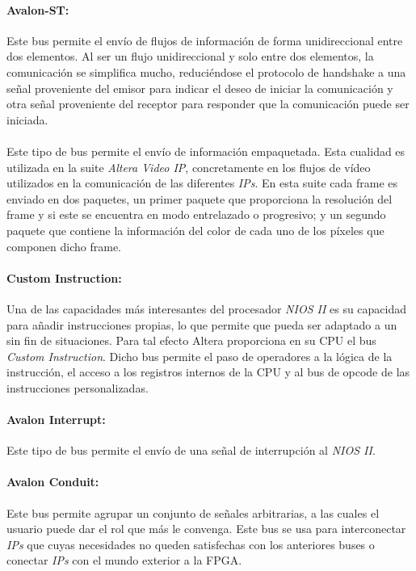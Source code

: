 \documentclass[a4paper,12pt,titlepage,final]{book}
\begin{document}
\paragraph{Avalon-ST:}
Este bus permite el envío de flujos de información de forma unidireccional entre dos elementos. Al ser un flujo unidireccional y solo entre dos elementos, la comunicación se simplifica mucho, reduciéndose el protocolo de handshake a una señal proveniente del emisor para indicar el deseo de iniciar la comunicación y otra señal proveniente del receptor para responder que la comunicación puede ser iniciada.

\paragraph{}
Este tipo de bus permite el envío de información empaquetada. Esta cualidad es utilizada en la suite \textit{Altera Video IP}, concretamente en los flujos de vídeo utilizados en la comunicación de las diferentes \textit{IPs}. En esta suite cada frame es enviado en dos paquetes, un primer paquete que proporciona la resolución del frame y si este se encuentra en modo entrelazado o progresivo; y un segundo paquete que contiene la información del color de cada uno de los píxeles que componen dicho frame. 

\paragraph{Custom Instruction:}
Una de las capacidades más interesantes del procesador \textit{NIOS II} es su capacidad para añadir instrucciones propias, lo que permite que pueda ser adaptado a un sin fin de situaciones. Para tal efecto Altera proporciona en su CPU el bus \textit{Custom Instruction}. Dicho bus permite el paso de operadores a la lógica de la instrucción, el acceso a los registros internos de la CPU y al bus de opcode de las instrucciones personalizadas.  

\paragraph{Avalon Interrupt:}
Este tipo de bus permite el envío de una señal de interrupción al \textit{NIOS II}.
 
\paragraph{Avalon Conduit:}
Este bus permite agrupar un conjunto de señales arbitrarias, a las cuales el usuario puede dar el rol que más le convenga. Este bus se usa para interconectar \textit{IPs} que cuyas necesidades no queden satisfechas con los anteriores buses o conectar \textit{IPs} con el mundo exterior a la FPGA.
\end{document}
